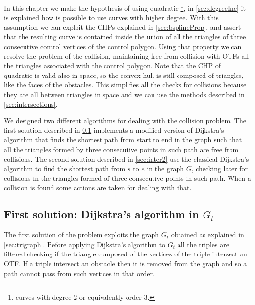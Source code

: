 \documentclass[dissertation.tex]{subfiles}
\begin{document}
In this chapter we make the hypothesis of using
quadratic \bss\footnote{\bss curves with degree 2 or equivalently order 3.}, in
\cref{sec:degreeInc} it is explained how is possible to use curves with
higher degree. With this assumption we can exploit the \acp{CHP}
explained in \cref{sec:bsplineProp}, and assert that the 
resulting curve is contained inside the union of all the triangles of
three consecutive control vertices of the control
polygon. Using that property we can resolve the problem of the
collision, maintaining free 
from collision with \acp{OTF} all the triangles associated with the control
polygon. Note that the \ac{CHP} of quadratic
\bss is valid also in space, so the convex hull is still composed
of triangles, like the faces of the
obstacles. This simplifies all the checks for collisions because they
are all between triangles in space and we can use the methods
described in \cref{sec:intersections}.

We designed two different algorithms for dealing with the collision
problem. The first solution described in \cref{sec:inter1} implements
a modified version of Dijkstra's
algorithm that finds the shortest path from start to end in the graph
such that all the triangles formed by three consecutive points in such path
are free from collisions. The second solution described in
\cref{sec:inter2} use the classical Dijkstra's algorithm to find
the shortest path from $s$ to $e$ in the graph $G$, checking later for
collisions in the triangles formed of three consecutive points in such
path. When a collision is found some actions are taken for dealing
with that.

\subsection{First solution: Dijkstra's algorithm in $G_t$}\label{sec:inter1}
The first solution of the problem exploits the graph $G_t$ obtained as
explained in \cref{sec:trigraph}. Before applying Dijkstra's algorithm
to $G_t$ all the triples are filtered checking if the
triangle composed of the vertices of the triple intersect an
\ac{OTF}. If a triple intersect an obstacle then it is removed from the
graph
and so a path cannot pass from such vertices in that order.
\end{document}
